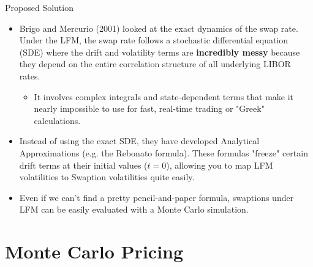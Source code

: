 \documentclass{beamer}
\begin{document}
\begin{frame}{Proposed Solution}
	\begin{itemize}
		\item Brigo and Mercurio (2001) looked at the exact dynamics of the swap rate. Under the LFM, the swap rate follows a stochastic differential equation (SDE) where the drift and volatility terms are \textbf{incredibly messy} because they depend on the entire correlation structure of all underlying LIBOR rates.
		\begin{itemize}
			\item It involves complex integrals and state-dependent terms that make it nearly impossible to use for fast, real-time trading or "Greek" calculations.
		\end{itemize}
		\item Instead of using the exact SDE, they have developed Analytical Approximations (e.g. the Rebonato formula). These formulas "freeze" certain drift terms at their initial values ($t=0$), allowing you to map LFM volatilities to Swaption volatilities quite easily.
		\item Even if we can't find a pretty pencil-and-paper formula, swaptions under LFM can be easily evaluated with a Monte Carlo simulation.
	\end{itemize}
\end{frame}

\section{Monte Carlo Pricing}
\end{document}
